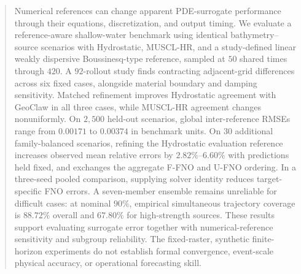 \begin{abstract}
Numerical references can change apparent PDE-surrogate performance through their equations, discretization, and output timing. We evaluate a reference-aware shallow-water benchmark using identical bathymetry--source scenarios with Hydrostatic, MUSCL-HR, and a study-defined linear weakly dispersive Boussinesq-type reference, sampled at $50$ shared times through $420$. A $92$-rollout study finds contracting adjacent-grid differences across six fixed cases, alongside material boundary and damping sensitivity. Matched refinement improves Hydrostatic agreement with GeoClaw in all three cases, while MUSCL-HR agreement changes nonuniformly. On $2{,}500$ held-out scenarios, global inter-reference RMSEs range from $0.00171$ to $0.00374$ in benchmark units. On $30$ additional family-balanced scenarios, refining the Hydrostatic evaluation reference increases observed mean relative errors by $2.82\%$--$6.60\%$ with predictions held fixed, and exchanges the aggregate F-FNO and U-FNO ordering. In a three-seed pooled comparison, supplying solver identity reduces target-specific FNO errors. A seven-member ensemble remains unreliable for difficult cases: at nominal $90\%$, empirical simultaneous trajectory coverage is $88.72\%$ overall and $67.80\%$ for high-strength sources. These results support evaluating surrogate error together with numerical-reference sensitivity and subgroup reliability. The fixed-raster, synthetic finite-horizon experiments do not establish formal convergence, event-scale physical accuracy, or operational forecasting skill.
\end{abstract}
